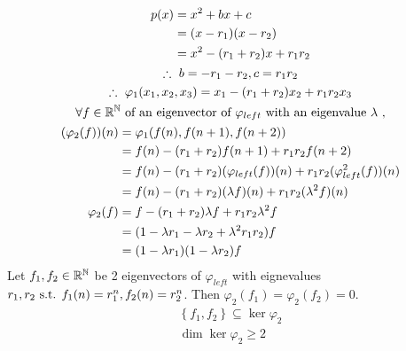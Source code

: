 \documentclass{mathtoolkit}
\begin{document}
\begin{p}
  \item
    \begin{gather*}
      \begin{aligned}
        p(x) & = x^2 + bx +c \\
             & = (x - r_1) (x - r_2) \\
             & = x^2 - (r_1 + r_2) x + r_1 r_2
      \end{aligned} \\
      \therefore b = - r_1 - r_2, c = r_1 r_2 \\
      \therefore \varphi_1(x_1, x_2, x_3) = x_1 - (r_1 + r_2) x_2 + r_1 r_2 x_3 \\
      \forall f \in \field{R}^\field{N} \text{of an eigenvector of $\varphi_{left}$ with an eigenvalue $\lambda$}, \\
      \begin{aligned}
        (\varphi_2(f))(n)
        & = \varphi_1(f(n), f(n+1), f(n+2)) \\
        & = f(n) - (r_1 + r_2) f(n+1) + r_1 r_2 f(n+2) \\
        & = f(n) - (r_1 + r_2) (\varphi_{left}(f))(n) + r_1 r_2 (\varphi_{left}^2(f))(n) \\
        & = f(n) - (r_1 + r_2) (\lambda f)(n) + r_1 r_2 (\lambda^2 f)(n) \\
        \varphi_2(f)
        & = f - (r_1 + r_2) \lambda f + r_1 r_2 \lambda^2 f \\
        & = (1 - \lambda r_1 - \lambda r_2 + \lambda^2 r_1 r_2) f \\
        & = (1 - \lambda r_1) (1 - \lambda r_2) f
      \end{aligned}
    \end{gather*}
    Let $f_1, f_2 \in \mathbb{R}^{\mathbb{N}}$ be 2 eigenvectors of $\varphi_{left}$
    with eignevalues $r_1, r_2 \st f_1(n) = r_1^n, f_2(n) = r_2^n$.
    Then $\varphi_2(f_1) = \varphi_2(f_2) = 0$.
    \begin{gather*}
      \left\{ f_1, f_2 \right\} \subseteq \ker{\varphi_2} \\
      \dim{\ker{\varphi_2}} \ge 2
    \end{gather*}


\end{p}
\end{document}
